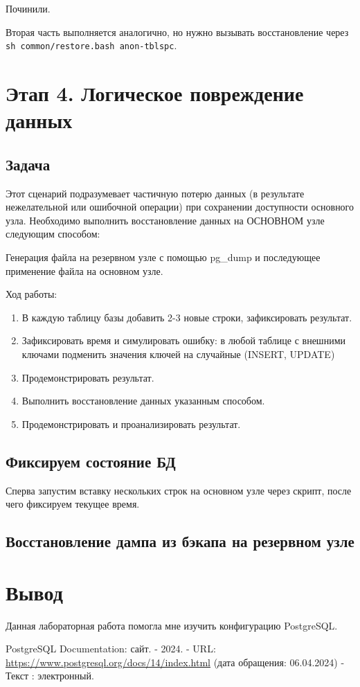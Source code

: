 \documentclass{article}
\begin{document}
Починили.

Вторая часть выполняется аналогично, но нужно вызывать восстановление через \texttt{sh common/restore.bash anon-tblspc}.

\section{Этап 4. Логическое повреждение данных}

\subsection{Задача}

Этот сценарий подразумевает частичную потерю данных (в результате нежелательной или ошибочной операции) при сохранении доступности основного узла. Необходимо выполнить восстановление данных на ОСНОВНОМ узле следующим способом:

Генерация файла на резервном узле с помощью pg\_dump и последующее применение файла на основном узле.

Ход работы:

\begin{enumerate}
    \item В каждую таблицу базы добавить 2-3 новые строки, зафиксировать результат.
    \item Зафиксировать время и симулировать ошибку: в любой таблице с внешними ключами подменить значения ключей на случайные (INSERT, UPDATE)
    \item Продемонстрировать результат.
    \item Выполнить восстановление данных указанным способом.
    \item Продемонстрировать и проанализировать результат.
\end{enumerate}

\subsection{Фиксируем состояние БД}

Сперва запустим вставку нескольких строк на основном узле через скрипт, после чего фиксируем текущее время.



\subsection{Восстановление дампа из бэкапа на резервном узле}

\section{Вывод}

Данная лабораторная работа помогла мне изучить конфигурацию PostgreSQL.

\begin{thebibliography}{99}
    PostgreSQL Documentation: сайт. - 2024.
    - URL: \url{https://www.postgresql.org/docs/14/index.html} (дата обращения: 06.04.2024) - Текст : электронный.
\end{thebibliography}
\end{document}
